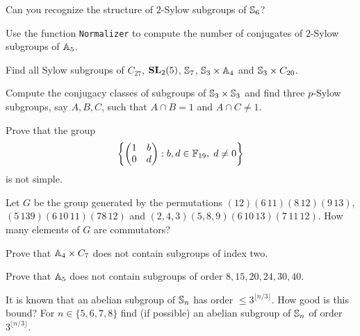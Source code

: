 \begin{prob}
  Can you recognize the structure of $2$-Sylow subgroups of $\mathbb{S}_6$?
\end{prob}

\begin{prob}
  Use the function \lstinline{Normalizer} to compute the number of conjugates
  of $2$-Sylow subgroups of $\mathbb{A}_5$. 
\end{prob}

\begin{prob}
    Find all Sylow subgroups of $C_{27}$, $\mathbf{SL}_2(5)$,
    $\mathbb{S}_7$, $\mathbb{S}_3\times\mathbb{A}_4$ and $\mathbb{S}_3\times C_{20}$. 
\end{prob}

\begin{prob}
  Compute the conjugacy classes of subgroups of $\mathbb{S}_3\times\mathbb{S}_3$ and find
  three $p$-Sylow subgroups, say $A,B,C$, such that $A\cap B=1$ and $A\cap
  C\ne1$.
\end{prob}

\begin{prob}
    Prove that the group
    \[
        \left\{\begin{pmatrix}
            1&b\\
            0&d
        \end{pmatrix}
        :b,d\in\mathbb{F}_{19},\;d\ne0
        \right\}
    \]
    is not simple.
\end{prob}

\begin{prob}
    Let $G$ be the group generated by the permutations 
    $(12)(6\,11)(8\,12)(9\,13)$, $(5\,139)(6\,10\,11)(78\,12)$ and 
    $(2,4,3)(5,8,9)(6\,10\,13)(7\,11\,12)$. 
    How many elements of $G$ are commutators?
\end{prob}

\begin{prob}
Prove that $\mathbb{A}_4\times C_7$ does not contain subgroups of index two.
\end{prob}

\begin{prob}
  \label{prob:A5:8,15,20,24,30,49}
  Prove that $\mathbb{A}_5$ does not contain subgroups of order $8,15,20,24,30,40$. 
\end{prob}

\begin{prob}
  It is known that an abelian subgroup of $\mathbb{S}_n$ has order
  $\leq3^{\lfloor n/3\rfloor}$. How good is this bound? For
  $n\in\{5,6,7,8\}$ find (if possible) an abelian subgroup of $\mathbb{S}_n$ of
  order $3^{\lfloor n/3\rfloor}$. 
\end{prob}

